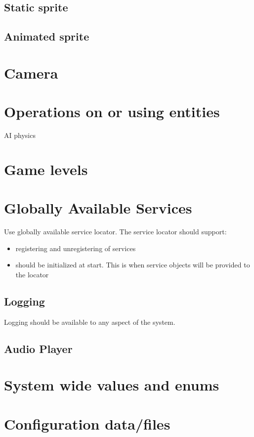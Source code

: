 \documentclass[12pt]{article}
\begin{document}
\subsection{Static sprite }
\subsection{Animated sprite }


\section{ Camera} \label{sec:Camera}

\section{	Operations on or using entities}
		AI
		physics

\section{	Game levels}

\section{ Globally Available Services}
Use globally available service locator.  The service locator should support:
\begin{itemize}
	\item registering and unregistering of services
	\item should be initialized at start.  This is when service objects will be provided to the locator
\end{itemize}

\subsection{ Logging }
Logging should be available to any aspect of the system. 
\subsection{ Audio Player} 

\section{	System wide values and enums}

\section{	Configuration data/files}
\end{document}
